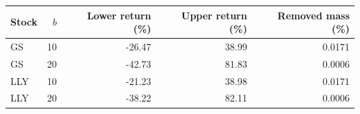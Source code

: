 \begin{tabular}{lrrrr}
\toprule
Stock & $b$ & Lower return (\%) & Upper return (\%) & Removed mass (\%) \\
\midrule
GS & 10 & -26.47 & 38.99 & 0.0171 \\
GS & 20 & -42.73 & 81.83 & 0.0006 \\
LLY & 10 & -21.23 & 38.98 & 0.0171 \\
LLY & 20 & -38.22 & 82.11 & 0.0006 \\
\bottomrule\end{tabular}
